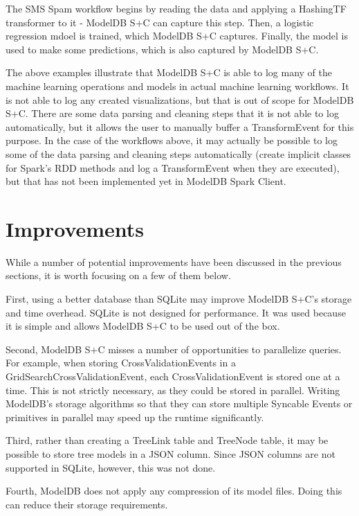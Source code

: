 The SMS Spam workflow begins by reading the data and applying a HashingTF transformer to it - ModelDB S+C
can capture this step. Then, a logistic regression mdoel is trained, which ModelDB S+C captures. Finally,
the model is used to make some predictions, which is also captured by ModelDB S+C.

The above examples illustrate that ModelDB S+C is able to log many of the machine learning operations and 
models in actual machine learning workflows. It is not able to log any created visualizations, but that is out
of scope for ModelDB S+C. There are some data parsing and cleaning steps that it is not able to log automatically, but
it allows the user to manually buffer a TransformEvent for this purpose. In the case of the workflows above, it
may actually be possible to log some of the data parsing and cleaning steps automatically (create implicit classes for
Spark's RDD methods and log a TransformEvent when they are executed), but that has not been
implemented yet in ModelDB Spark Client.

\section{Improvements}
While a number of potential improvements have been discussed in the previous sections,
it is worth focusing on a few of them below.

First, using a better database than SQLite may improve ModelDB S+C's storage and time
overhead. SQLite is not designed for performance. It was used because it is simple and allows
ModelDB S+C to be used out of the box.

Second, ModelDB S+C misses a number of opportunities to parallelize queries. For example,
when storing CrossValidationEvents in a GridSearchCrossValidationEvent, each CrossValidationEvent
is stored one at a time. This is not strictly necessary, as they could be stored in parallel.
Writing ModelDB's storage algorithms so that they can store multiple Syncable Events or primitives 
in parallel may speed up the runtime significantly.

Third, rather than creating a TreeLink table and TreeNode table, it may be possible to store
tree models in a JSON column. Since JSON columns are not supported in SQLite, however, this was
not done.

Fourth, ModelDB does not apply any compression of its model files. Doing this can reduce their storage requirements.

